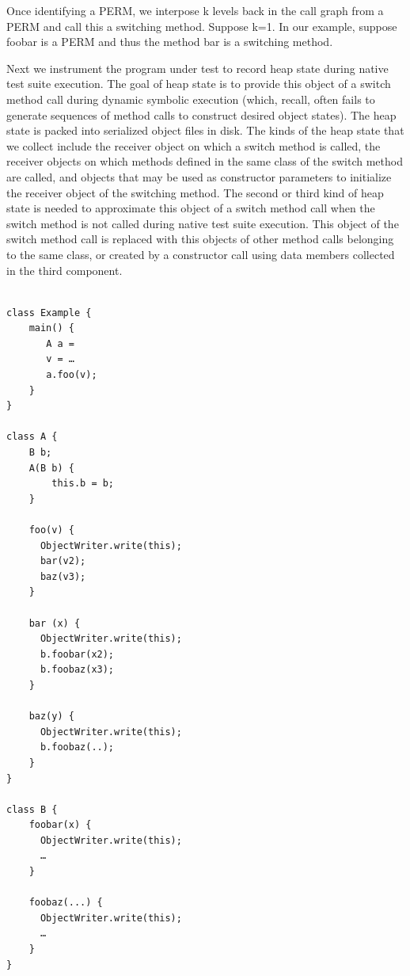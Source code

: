 
Once identifying a PERM, we interpose k levels back in the call graph from a PERM and call this a switching method.  Suppose k=1. In our example, suppose foobar is a PERM and thus the method bar is a switching method.  

Next we instrument the program under test to record heap state during native test suite execution. The goal of heap state is to provide this object of a switch method call during dynamic symbolic execution (which, recall, often fails to generate sequences of method calls to construct desired object states). The heap state is packed into serialized object files in disk. The kinds of the heap state that we collect include the receiver object on which a switch method is called, the receiver objects on which methods defined in the same class of the switch method are called, and objects that may be used as constructor parameters to initialize the receiver object of the switching method. The second or third kind of heap state is needed to approximate this object of a switch method call when the switch method is not called during native test suite execution. This object of the switch method call is replaced with this objects of other method calls belonging to the same class, or created by a constructor call using data members collected in the third component.

\begin{lstlisting}[style=JavaStyle, caption=An example Pig Latin program, label=lst:exampleInstrument, frame=none]

class Example {
	main() {
	   A a = 
	   v = …
	   a.foo(v);
	}
}

class A {
	B b;
	A(B b) {
		this.b = b;
	}

	foo(v) {
	  ObjectWriter.write(this);
	  bar(v2);
	  baz(v3);
	}

	bar (x) {
	  ObjectWriter.write(this);
	  b.foobar(x2);
	  b.foobaz(x3);
	}

	baz(y) {
	  ObjectWriter.write(this);
	  b.foobaz(..);
	}
}

class B {
	foobar(x) {
	  ObjectWriter.write(this);
	  …
	}

	foobaz(...) {
	  ObjectWriter.write(this);
	  …
	}
}
\end{lstlisting}


